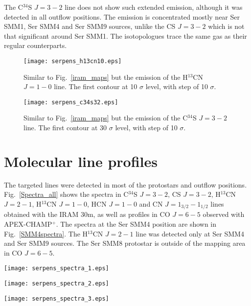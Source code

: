 \documentclass{aa}
\begin{document}
\begin{appendix}
The C$^{34}$S $J=3-2$ line does not show such extended emission, although it was detected in all outflow positions. The emission is concentrated mostly near Ser SMM1, Ser SMM4 and Ser SMM9 sources, unlike the CS $J=3-2$ which is not that significant around Ser SMM1. The isotopologues trace the same gas as their regular counterparts.

\begin{figure} \texttt{[image: serpens\_h13cn10.eps]} \caption{Similar to Fig.~\ref{iram_maps}
but the emission of the H$^{13}$CN $J=1-0$ line. The first contour at 10 $\sigma$ level, with step
of 10 $\sigma$.} \label{h13cn10} \end{figure}


\begin{figure} \texttt{[image: serpens\_c34s32.eps]} \caption{Similar to Fig.~\ref{iram_maps}
but the emission of the C$^{34}$S $J=3-2$ line. The first contour at 30 $\sigma$ level, with step of
10 $\sigma$.} \label{c34s32} \end{figure}

\section{Molecular line profiles}

The targeted lines were detected in most of the protostars and outflow positions. Fig.~\ref{Spectra_all} shows the spectra in C$^{34}$S $J=3-2$, CS $J=3-2$, H$^{13}$CN $J=2-1$, H$^{13}$CN $J=1-0$, HCN $J=1-0$ and CN $J=1_{3/2}-1_{1/2}$  lines obtained with the IRAM 30m, as well as profiles in CO $J=6-5$ observed with APEX-CHAMP$^+$. The spectra at the Ser SMM4 position are shown in Fig.~\ref{SMM4spectra}. The H$^{13}$CN $J=2-1$ line was detected only at Ser SMM4 and Ser SMM9 sources. The Ser SMM8 protostar is outside of the mapping area in CO $J=6-5$.



\begin{figure*} 
\centering 
\texttt{[image: serpens\_spectra\_1.eps]}
\label{Spectra1} 
\end{figure*} 

\begin{figure*} 
\centering
\texttt{[image: serpens\_spectra\_2.eps]} 
\label{Spectra2} 
\end{figure*}

\begin{figure*}
\centering 
\texttt{[image: serpens\_spectra\_3.eps]}
\label{Spectra3} 
\end{figure*} 


\end{appendix}
\end{document}

